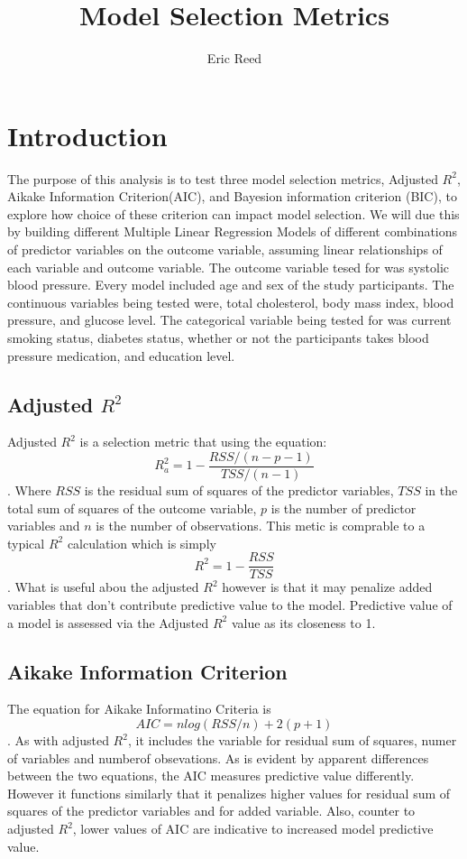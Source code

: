 \documentclass{article}\usepackage[]{graphicx}\usepackage[]{color}
\begin{document}
\title{Model Selection Metrics}
\author{Eric Reed}
\maketitle
{}



\section{Introduction}

  The purpose of this analysis is to test three model selection metrics, Adjusted $R^2$, Aikake Information Criterion(AIC), and Bayesion information criterion (BIC), to explore how choice of these criterion can impact model selection. We will due this by building different Multiple Linear Regression Models of different combinations of predictor variables on the outcome variable, assuming linear relationships of each variable and outcome variable.  The outcome variable tesed for was systolic blood pressure.  Every model included age and sex of the study participants. The continuous variables being tested were, total cholesterol, body mass index, blood pressure, and glucose level.  The categorical variable being tested for was current smoking status, diabetes status, whether or not the participants takes blood pressure medication, and education level.

\subsection{Adjusted $R^2$}
  Adjusted $R^2$ is a selection metric that using the equation: $$R^2_a = 1-\frac{RSS/(n-p-1)}{TSS/(n-1)}$$.  Where $RSS$ is the residual sum of squares of the predictor variables, $TSS$ in the total sum of squares of the  outcome variable, $p$ is the number of predictor variables and $n$ is the number of observations.  This metic is comprable to a typical $R^2$ calculation which is simply $$R^2=1-\frac{RSS}{TSS}$$.  What is useful abou the adjusted $R^2$ however is that it may penalize added variables that don't contribute predictive value to the model.  Predictive value of a model is assessed via the Adjusted $R^2$ value as its closeness to 1.
\subsection{Aikake Information Criterion}
 The equation for Aikake Informatino Criteria is $$ AIC=nlog(RSS/n)+2(p+1)$$.  As with adjusted $R^2$, it includes the variable for residual sum of squares, numer of variables and numberof obsevations.  As is evident by apparent differences between the two equations, the AIC measures predictive value differently.  However it functions similarly that it penalizes higher values for residual sum of squares of the predictor variables and for added variable.  Also, counter to adjusted $R^2$, lower values of AIC are indicative to increased model predictive value.
\end{document}
